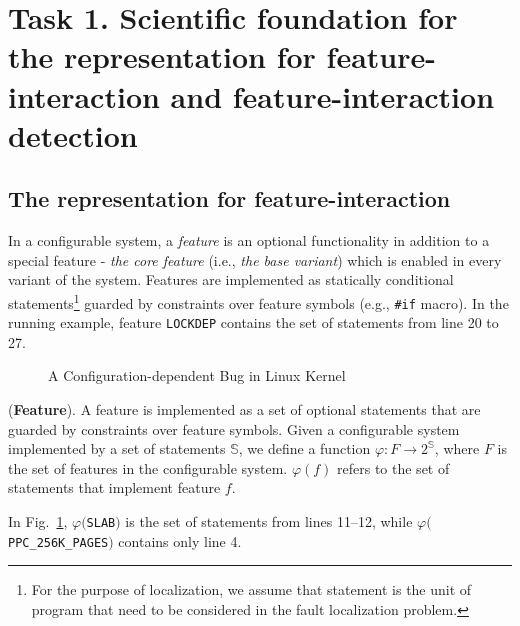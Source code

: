 \section{Task 1. Scientific foundation for the representation for feature-interaction and feature-interaction detection}
\label{task1-section}

\subsection{The representation for feature-interaction}
In a configurable system, a \textit{feature} is an optional
functionality in addition to a special feature - \textit{the core
  feature} (i.e., \textit{the base variant}) which is enabled in every variant of the system. Features
are implemented as statically conditional statements\footnote{For the
  purpose of localization, we assume that statement is the unit of
  program that need to be considered in the fault localization
  problem.} guarded by constraints over feature symbols (e.g.,
\texttt{\#if} macro). In the running example, feature \texttt{LOCKDEP}
contains the set of statements from line 20 to 27.

\begin{figure}[h]
\begin{center}

\caption{A Configuration-dependent Bug in Linux Kernel}
\label{example_bug}
\end{center}
\end{figure}

\begin{Definition}{({\bf Feature}).}
A feature is implemented as a set of optional statements that are 
guarded by constraints over feature symbols. Given a configurable 
system implemented by a set of statements $\mathbb{S}$, we define a function 
$\varphi: F\to 2^{\mathbb{S}}$, where $F$ is the set of features in the 
configurable system. $\varphi(f)$ refers to the set of statements 
that implement feature $f$.
\end{Definition}

In Fig.~\ref{example_bug}, $\varphi($\texttt{SLAB}$)$ is the set of
statements from lines 11--12, while
$\varphi($\texttt{PPC\_256K\_PAGES}$)$ contains only line 4.


